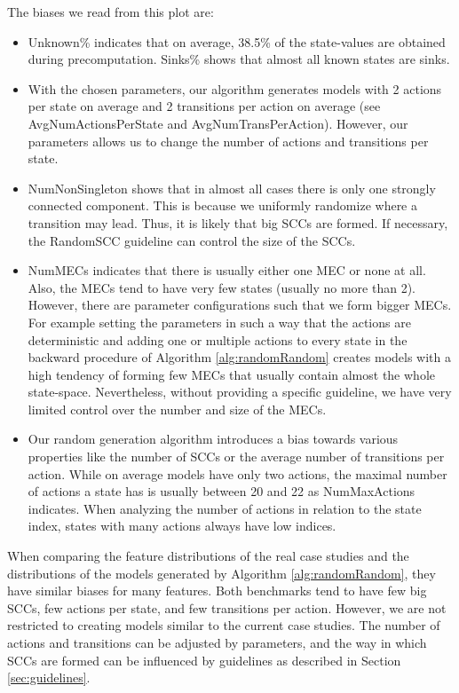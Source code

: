 The biases we read from this plot are:
\begin{itemize} \label{insights:randomRandom}
    \item Unknown\% indicates that on average, 38.5\% of the state-values are obtained during precomputation. Sinks\% shows that almost all known states are sinks.
    \item With the chosen parameters, our algorithm generates models with 2 actions per state on average and 2 transitions per action on average (see AvgNumActionsPerState and AvgNumTransPerAction).     
     However, our parameters allows us to change the number of actions and transitions per state.
    \item NumNonSingleton shows that in almost all cases there is only one strongly connected component.
        This is because we uniformly randomize where a transition may lead. Thus, it is likely that big SCCs are formed. 
        If necessary, the RandomSCC guideline can control the size of the SCCs.
    \item NumMECs indicates that there is usually either one MEC or none at all. Also, the MECs tend to have very few states (usually no more than 2).
    However, there are parameter configurations such that we form bigger MECs. For example setting the parameters in such a way that the actions are deterministic
    and adding one or multiple actions to every state in the backward procedure of Algorithm \ref{alg:randomRandom} creates models with a high tendency of forming few MECs that usually contain almost the whole state-space.
    Nevertheless, without providing a specific guideline, we have very limited control over the number and size of the MECs.
    \item Our random generation algorithm introduces a bias towards various properties like the number of SCCs or the average number of transitions per action.
    While on average models have only two actions, the maximal number of actions a state has is usually between 20 and 22 as NumMaxActions indicates.
    When analyzing the number of actions in relation to the state index, states with many actions always have low indices.
\end{itemize}

When comparing the feature distributions of the real case studies and the distributions of the models generated by Algorithm \ref{alg:randomRandom},
they have similar biases for many features. Both benchmarks tend to have few big SCCs, few actions per state, and few transitions per action.
However, we are not restricted to creating models similar to the current case studies. The number of actions and transitions can be adjusted by parameters,
and the way in which SCCs are formed can be influenced by guidelines as described in Section \ref{sec:guidelines}.
\FloatBarrier

